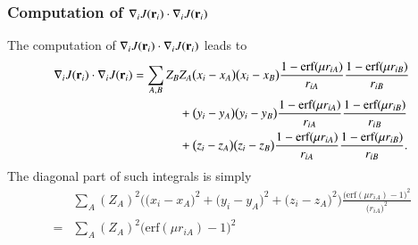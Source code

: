 \documentclass[aip,jcp,reprint,noshowkeys,superscriptaddress]{revtex4-1}
\begin{document}
\subsubsection{Computation of $\nabla_i J({\bf r}_i) \cdot \nabla_i J({\bf r}_i)$}
The computation of $\nabla_i J({\bf r}_i) \cdot \nabla_i J({\bf r}_i)$ leads to 
\begin{equation}
 \begin{aligned}
  \nabla_i J({\bf r}_i) \cdot \nabla_i J({\bf r}_i) =  \sum_{A,B} Z_B &Z_A \big( x_i - x_A \big) \big( x_i - x_B \big)  \frac{ 1 -\text{erf}(\mu r_{iA})}{r_{iA}} \frac{ 1 - \text{erf}(\mu r_{iB})}{r_{iB}} \\
                                                                      & +  \big( y_i - y_A \big) \big( y_i - y_B \big)  \frac{ 1 -\text{erf}(\mu r_{iA})}{r_{iA}} \frac{ 1 - \text{erf}(\mu r_{iB})}{r_{iB}} \\ 
                                                                      & +  \big( z_i - z_A \big) \big( z_i - z_B \big)  \frac{ 1 -\text{erf}(\mu r_{iA})}{r_{iA}} \frac{ 1 - \text{erf}(\mu r_{iB})}{r_{iB}}.
 \end{aligned}
\end{equation}
The diagonal part of such integrals is simply
\begin{equation}
 \begin{aligned}
 &  \sum_{A} (Z_A)^2 \bigg(\big( x_i - x_A \big)^2 +  \big( y_i - y_A \big)^2 + \big( z_i - z_A \big)^2\bigg) \frac{\bigg(\text{erf}(\mu r_{iA}) - 1\bigg)^2}{\big(r_{iA}\big)^2}\\ 
  = & \sum_{A} (Z_A)^2 \bigg( \text{erf}(\mu r_{iA}) -1 \bigg)^2
 \end{aligned}
\end{equation}
\end{document}
